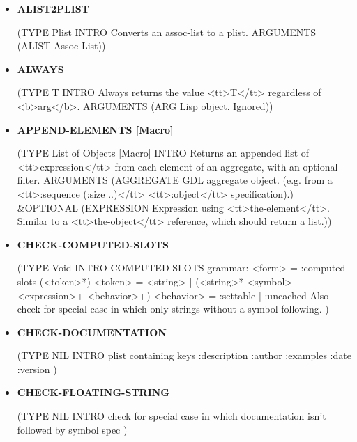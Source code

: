 \documentclass [11pt]{book}
\begin{document}
\begin{itemize}

\item {}
\label{prim:alist2plist}
\textbf{ALIST2PLIST}

(TYPE Plist INTRO  Converts an assoc-list to a plist.
 ARGUMENTS (ALIST Assoc-List))



\item {}
\label{prim:always}
\textbf{ALWAYS}

(TYPE T INTRO  Always returns the value <tt>T</tt> regardless of <b>arg</b>.
 ARGUMENTS (ARG Lisp object. Ignored))



\item {}
\label{prim:append-elements}
\textbf{APPEND-ELEMENTS [Macro]}

(TYPE List of Objects [Macro] INTRO  Returns an appended list of <tt>expression</tt> from each element of an aggregate,
with an optional filter.
 ARGUMENTS (AGGREGATE GDL aggregate object. (e.g. from a <tt>:sequence (:size ..)</tt> <tt>:object</tt> specification).) \&OPTIONAL (EXPRESSION Expression using <tt>the-element</tt>. Similar to a <tt>the-object</tt> reference, which should return a list.))



\item {}
\label{prim:check-computed-slots}
\textbf{CHECK-COMPUTED-SLOTS}

(TYPE Void INTRO  COMPUTED-SLOTS grammar: 
<form>     = :computed-slots (<token>*)
<token>    = <string> | (<string>* <symbol> <expression>+ <behavior>+)
<behavior> = :settable | :uncached
Also check for special case in which only strings without a symbol following.
)



\item {}
\label{prim:check-documentation}
\textbf{CHECK-DOCUMENTATION}

(TYPE NIL INTRO plist containing keys :description :author :examples :date :version
)



\item {}
\label{prim:check-floating-string}
\textbf{CHECK-FLOATING-STRING}

(TYPE NIL INTRO check for special case in which documentation isn't followed by symbol spec
)




\end{itemize}
\end{document}
